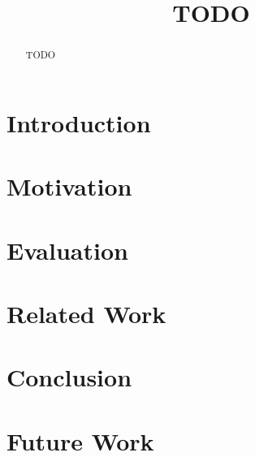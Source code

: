 \documentclass[sigconf]{acmart}
\begin{document}
	
	
	\title{TODO}
	
	
	\author{}
	\email{}
	\orcid{}
	\author{}
	\authornotemark[]
	\email{}
	\affiliation{%
		\institution{}
		\streetaddress{}
		\city{}
		\state{}
		\country{}
		\postcode{}
	}
	
	
	\begin{abstract}
		TODO
	\end{abstract}
	

	
	
	
	\maketitle
	
	\section{Introduction}
	
	\section{Motivation}
	
	\section{Evaluation}
	
	\section{Related Work}
	
	\section{Conclusion}
	
	\section{Future Work}
	
	
\end{document}
